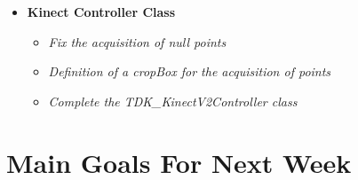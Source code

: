 \documentclass[11pt]{article} %
\begin{document}
\begin{itemize}
\begin{itemize}
\end{itemize}

\item \textbf{Kinect Controller Class}
\begin{itemize}
\item \textit{Fix the acquisition of null points}
\item \textit{Definition of a cropBox for the acquisition of points}
\item \textit{Complete the TDK\_KinectV2Controller class}
\end{itemize}

\end{itemize}

\section{Main Goals For Next Week}
\end{document}
